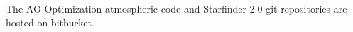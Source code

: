 The AO Optimization atmospheric code and Starfinder 2.0 git repositories are hosted on bitbucket. 
\label{fig:diss_git_repos}
